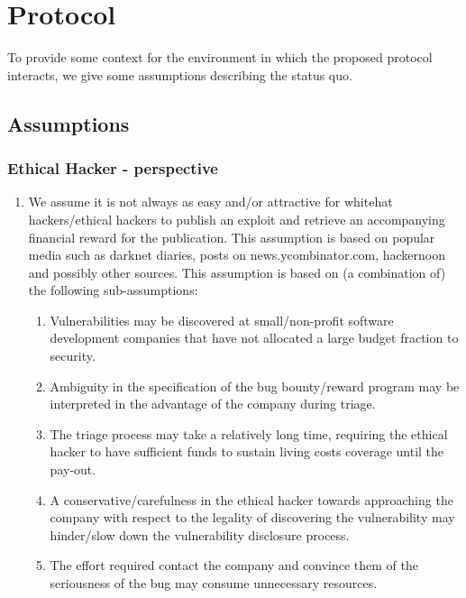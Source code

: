 \section{Protocol}
\label{sec:protocol}
To provide some context for the environment in which the proposed protocol interacts, we give some assumptions describing the status quo.

\subsection{Assumptions}
\subsubsection{Ethical Hacker - perspective}
\begin{enumerate}
	\item We assume it is not always as easy and/or attractive for whitehat hackers/ethical hackers to publish an exploit and retrieve an accompanying financial reward for the publication. This assumption is based on popular media such as darknet diaries, posts on news.ycombinator.com, hackernoon and possibly other sources. This assumption is based on (a combination of) the following sub-assumptions:
	\begin{enumerate}
		\item Vulnerabilities may be discovered at small/non-profit software development companies that have not allocated a large budget fraction to security.
		\item Ambiguity in the specification of the bug bounty/reward program may be interpreted in the advantage of the company during triage.
		\item The triage process may take a relatively long time, requiring the ethical hacker to have sufficient funds to sustain living costs coverage until the pay-out.
		\item A conservative/carefulness in the ethical hacker towards approaching the company with respect to the legality of discovering the vulnerability may hinder/slow down the vulnerability disclosure process.
		\item The effort required contact the company and convince them of the seriousness of the bug may consume unnecessary resources.
	\end{enumerate}
\end{enumerate}


